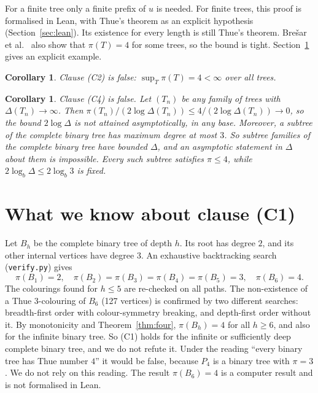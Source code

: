 \documentclass[11pt]{article}
\newtheorem{corollary}[theorem]{Corollary}
\theoremstyle{definition}
\theoremstyle{remark}
\begin{document}
For a finite tree only a finite prefix of $u$ is needed. For finite trees, this proof is
formalised in Lean, with Thue's theorem as an explicit hypothesis (Section~\ref{sec:lean}). Its existence for every length is still
Thue's theorem. Bre\v{s}ar et al.~\cite{BGKNP} also show that $\pi(T)=4$ for some trees, so the
bound is tight. Section~\ref{sec:c1} gives an explicit example.

\begin{corollary}\label{cor:c2}
Clause (C2) is false: $\sup_T \pi(T)=4<\infty$ over all trees.
\end{corollary}

\begin{corollary}\label{cor:c4}
Clause (C4) is false. Let $(T_n)$ be any family of trees with $\Delta(T_n)\to\infty$. Then
$\pi(T_n)/(2\log\Delta(T_n))\le 4/(2\log\Delta(T_n))\to0$, so the bound $2\log\Delta$ is not
attained asymptotically, in any base. Moreover, a subtree of the complete binary tree has maximum
degree at most $3$. So subtree families of the complete binary tree have bounded $\Delta$, and an
asymptotic statement in $\Delta$ about them is impossible. Every such subtree satisfies
$\pi\le 4$, while $2\log_b\Delta\le 2\log_b 3$ is fixed.
\end{corollary}

\section{\texorpdfstring{What we know about clause (C1)}{What we know about clause (C1)}}
\label{sec:c1}

Let $B_h$ be the complete binary tree of depth $h$. Its root has degree $2$, and its other
internal vertices have degree $3$. An exhaustive backtracking search (\texttt{verify.py}) gives
\[
\pi(B_1)=2,\quad \pi(B_2)=\pi(B_3)=\pi(B_4)=\pi(B_5)=3,\quad \pi(B_6)=4.
\]
The colourings found for $h\le5$ are re-checked on all paths. The non-existence of a Thue
$3$-colouring of $B_6$ (127 vertices) is confirmed by two different searches: breadth-first order
with colour-symmetry breaking, and depth-first order without it. By monotonicity and
Theorem~\ref{thm:four}, $\pi(B_h)=4$ for all $h\ge6$, and also for the infinite binary tree. So
(C1) holds for the infinite or sufficiently deep complete binary tree, and we do not refute it.
Under the reading ``every binary tree has Thue number $4$'' it would be false, because $P_4$ is a
binary tree with $\pi=3$. We do not rely on this reading. The result $\pi(B_6)=4$ is a computer
result and is not formalised in Lean.
\end{document}
